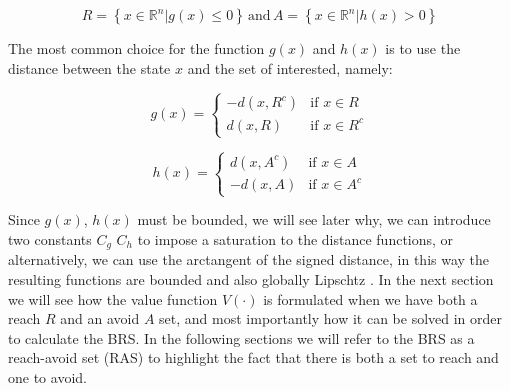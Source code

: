 \begin{equation} 
\label{R_A}
R = \left\{ x \in \mathbb{R}^n | g(x) \leq 0 \right\} \, \textrm{and} \, A = \left\{x \in \mathbb{R}^n | h(x) > 0 \right\}
\end{equation}

The most common choice for the function $g(x)$ and $h(x)$ is to use the distance between the state $x$ and the set of interested, namely:

\begin{equation}
\label{g}
    g(x) =
\left\{
	\begin{array}{ll}
		-d(x, R^c)  & \mbox{if } x \in R \\
		d(x, R) & \mbox{if } x \in R^c
	\end{array}
\right.
\end{equation}

\begin{equation}
\label{h}
    h(x) =
\left\{
	\begin{array}{ll}
		d(x, A^c)  & \mbox{if } x \in A \\
		-d(x, A) & \mbox{if } x \in A^c
	\end{array}
\right.
\end{equation}

Since $g(x)$, $h(x)$ must be bounded, we will see later why, we can introduce two constants $C_g$ $C_h$ to impose a saturation to the distance functions, or alternatively, we can use the arctangent of the signed distance, in this way the resulting functions are bounded and also globally Lipschtz \cite{reach_avoid_no_dist}. 
In the next section we will see how the value function $V(\cdot)$ is formulated when we have both a reach $R$ and an avoid $A$ set, and most importantly how it can be solved in order to calculate the BRS. In the following sections we will refer to the BRS as a reach-avoid set (RAS) to highlight the fact that there is both a set to reach and one to avoid.